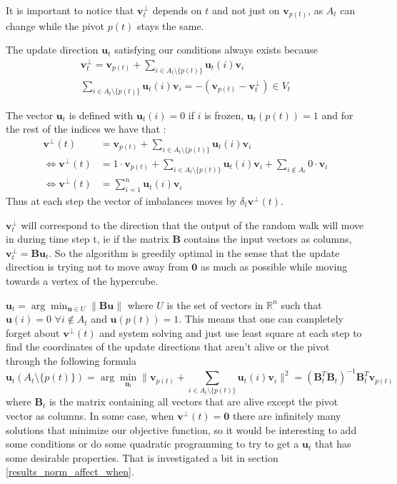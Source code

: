 \documentclass[12pt]{article}
\begin{document}
It is important to notice that $\textbf{v}^{\perp}_t$ depends on $t$ and not just on $\textbf{v}_{p(t)}$, as $A_t$ can change while the pivot $p(t)$ stays the same.

The update direction $\textbf{u}_t$ satisfying our conditions always exists because
\begin{align*}
        \textbf{v}^\perp_t = \textbf{v}_{p(t)} + \sum_{i \in A_t \setminus \{p(t)\}} \textbf{u}_t(i)\textbf{v}_i\\
        \sum_{i \in A_t \setminus \{p(t)\}} \textbf{u}_t(i)\textbf{v}_i = -(\textbf{v}_{p(t)} - \textbf{v}^\perp_t) \in V_t
\end{align*}

The vector $\textbf{u}_t$ is defined with $\textbf{u}_t(i)=0$ if $i$ is frozen, $\textbf{u}_t(p(t))=1$ and for the rest of the indices we have that :
\begin{align*}
\textbf{v}^\perp(t) &= \textbf{v}_{p(t)} + \sum_{i \in A_t \setminus \{p(t)\}} \textbf{u}_t(i)\textbf{v}_i\\
\Leftrightarrow \textbf{v}^\perp(t) &= 1 \cdot \textbf{v}_{p(t)} + \sum_{i \in A_t \setminus \{p(t)\}} \textbf{u}_t(i)\textbf{v}_i + \sum_{i \notin A_t} 0 \cdot \textbf{v}_i\\
\Leftrightarrow \textbf{v}^\perp(t) &= \sum_{i=1}^n \textbf{u}_t(i)\textbf{v}_i
\end{align*}
Thus at each step the vector of imbalances moves by $\delta_t\textbf{v}^\perp(t)$.

$\textbf{v}^\perp_t$ will correspond to the direction that the output of the random walk will move in during time step t, ie if the matrix $\textbf{B}$ contains the input vectors as columns, $\textbf{v}^\perp_t = \textbf{Bu}_t$. So the algorithm is greedily optimal in the sense that the update direction is trying not to move away from $\textbf{0}$ as much as possible while moving towards a vertex of the hypercube.

$\textbf{u}_t = \arg\min_{\textbf{u} \in U} \|\textbf{Bu}\|$ where $U$ is the set of vectors in $\mathbb{R}^n$ such that $\textbf{u}(i) = 0$ $\forall i \not\in A_t$ and $\textbf{u}(p(t))=1$. This means that one can completely forget about $\textbf{v}^\perp(t)$ and system solving and just use least square at each step to find the coordinates of the update directions that aren't alive or the pivot through the following formula $$\textbf{u}_t(A_t\setminus\{p(t)\})=\arg\min_{\textbf{u}_t}\|\textbf{v}_{p(t)}+\sum_{i\in A_t\setminus\{p(t)\}}\textbf{u}_t(i)\textbf{v}_i\|^2=(\textbf{B}_t^T\textbf{B}_t)^{-1}\textbf{B}_t^T\textbf{v}_{p(t)}$$ where $\textbf{B}_t$ is the matrix containing all vectors that are alive except the pivot vector as columns. In some case, when $\textbf{v}^\perp(t)=\textbf{0}$ there are infinitely many solutions that minimize our objective function, so it would be interesting to add some conditions or do some quadratic programming to try to get a $\textbf{u}_t$ that has some desirable properties. That is investigated a bit in section \ref{results_norm_affect_when}.
\end{document}
